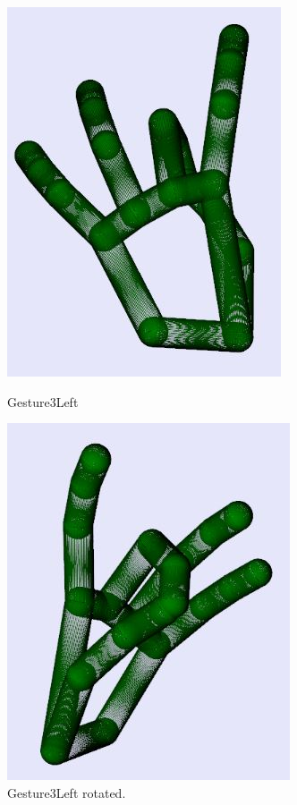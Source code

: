 \begin{figure}[H]
    \centering
    \begin{minipage}{0.5\textwidth}
        \centering
        \includegraphics[scale=.75]{Figures/gesture3Left.JPG} 
        \caption[Gesture3Left]{Gesture3Left}
		\label{fig:Gesture3Left}
    \end{minipage}\hfill
    \begin{minipage}{0.5\textwidth}
        \centering
        \includegraphics[scale=.75]{Figures/gesture3Left_rotated.JPG}
        \caption[Gesture3Left Rotated]{Gesture3Left rotated.}
        \label{fig:Gesture3Left_rotated}
    \end{minipage}
\end{figure}

